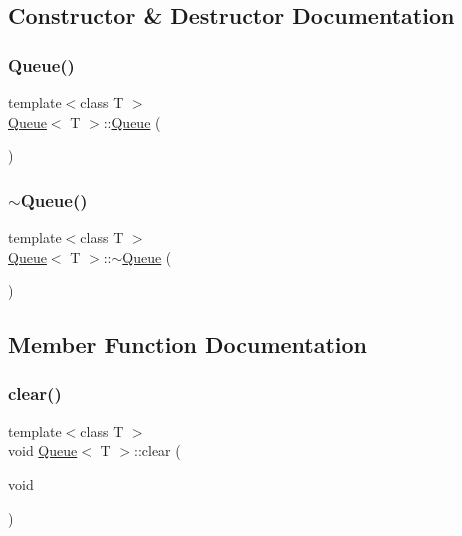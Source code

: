 \subsection{Constructor \& Destructor Documentation}
\mbox{\label{class_queue_af73bb29c868f7b37f369c668f114bd9f}} 
\subsubsection{\texorpdfstring{Queue()}{Queue()}}
{\footnotesize\ttfamily template$<$class T $>$ \\
\hyperlink{class_queue}{Queue}$<$ T $>$\+::\hyperlink{class_queue}{Queue} (\begin{DoxyParamCaption}{ }\end{DoxyParamCaption})}

\mbox{\label{class_queue_aa7eef1b427e24555780505de20e9acbc}} 
\subsubsection{\texorpdfstring{$\sim$\+Queue()}{~Queue()}}
{\footnotesize\ttfamily template$<$class T $>$ \\
\hyperlink{class_queue}{Queue}$<$ T $>$\+::$\sim$\hyperlink{class_queue}{Queue} (\begin{DoxyParamCaption}{ }\end{DoxyParamCaption})\hspace{0.3cm}{\ttfamily [virtual]}}



\subsection{Member Function Documentation}
\mbox{\label{class_queue_ae1371a83e78df0c50fca4654e1e5c224}} 
\subsubsection{\texorpdfstring{clear()}{clear()}}
{\footnotesize\ttfamily template$<$class T $>$ \\
void \hyperlink{class_queue}{Queue}$<$ T $>$\+::clear (\begin{DoxyParamCaption}\item[{void}]{ }\end{DoxyParamCaption})}

